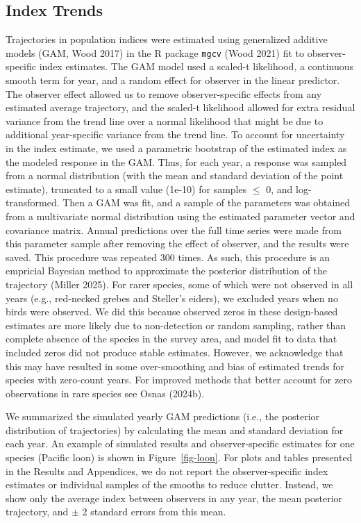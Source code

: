 \documentclass[
]{article}
\begin{document}
\subsection*{Index Trends}\label{index-trends}

Trajectories in population indices were estimated using generalized
additive models (GAM, Wood 2017) in the R package \texttt{mgcv} (Wood
2021) fit to observer-specific index estimates. The GAM model used a
scaled-t likelihood, a continuous smooth term for year, and a random
effect for observer in the linear predictor. The observer effect allowed
us to remove observer-specific effects from any estimated average
trajectory, and the scaled-t likelihood allowed for extra residual
variance from the trend line over a normal likelihood that might be due
to additional year-specific variance from the trend line. To account for
uncertainty in the index estimate, we used a parametric bootstrap of the
estimated index as the modeled response in the GAM. Thus, for each year,
a response was sampled from a normal distribution (with the mean and
standard deviation of the point estimate), truncated to a small value
(1e-10) for samples \(\leq\) 0, and log-transformed. Then a GAM was fit,
and a sample of the parameters was obtained from a multivariate normal
distribution using the estimated parameter vector and covariance matrix.
Annual predictions over the full time series were made from this
parameter sample after removing the effect of observer, and the results
were saved. This procedure was repeated 300 times. As such, this
procedure is an empricial Bayesian method to approximate the posterior
distribution of the trajectory (Miller 2025). For rarer species, some of
which were not observed in all years (e.g., red-necked grebes and
Steller's eiders), we excluded years when no birds were observed. We did
this because observed zeros in these design-based estimates are more
likely due to non-detection or random sampling, rather than complete
absence of the species in the survey area, and model fit to data that
included zeros did not produce stable estimates. However, we acknowledge
that this may have resulted in some over-smoothing and bias of estimated
trends for species with zero-count years. For improved methods that
better account for zero observations in rare species see Osnas (2024b).

We summarized the simulated yearly GAM predictions (i.e., the posterior
distribution of trajectories) by calculating the mean and standard
deviation for each year. An example of simulated results and
observer-specific estimates for one species (Pacific loon) is shown in
Figure~\ref{fig-loon}. For plots and tables presented in the Results and
Appendices, we do not report the observer-specific index estimates or
individual samples of the smooths to reduce clutter. Instead, we show
only the average index between observers in any year, the mean posterior
trajectory, and \(\pm\) 2 standard errors from this mean.
\end{document}
